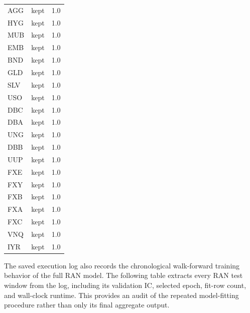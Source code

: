 \documentclass[10pt]{article}
\begin{document}
\begin{longtable}{lrr}
AGG & kept & 1.0 \\
HYG & kept & 1.0 \\
MUB & kept & 1.0 \\
EMB & kept & 1.0 \\
BND & kept & 1.0 \\
GLD & kept & 1.0 \\
SLV & kept & 1.0 \\
USO & kept & 1.0 \\
DBC & kept & 1.0 \\
DBA & kept & 1.0 \\
UNG & kept & 1.0 \\
DBB & kept & 1.0 \\
UUP & kept & 1.0 \\
FXE & kept & 1.0 \\
FXY & kept & 1.0 \\
FXB & kept & 1.0 \\
FXA & kept & 1.0 \\
FXC & kept & 1.0 \\
VNQ & kept & 1.0 \\
IYR & kept & 1.0 \\
\bottomrule
\end{longtable}
\endgroup

The saved execution log also records the chronological walk-forward training behavior of the full RAN model. The following table extracts every RAN test window from the log, including its validation IC, selected epoch, fit-row count, and wall-clock runtime. This provides an audit of the repeated model-fitting procedure rather than only its final aggregate output.
\end{document}

